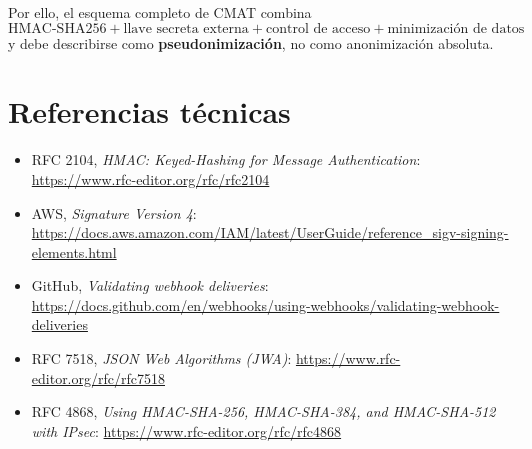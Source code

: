 \documentclass[11pt,a4paper]{article}
\begin{document}
Por ello, el esquema completo de CMAT combina
\[
\boxed{
\text{HMAC-SHA256}
+
\text{llave secreta externa}
+
\text{control de acceso}
+
\text{minimización de datos}
}
\]
y debe describirse como \textbf{pseudonimización}, no como anonimización absoluta.

\section{Referencias técnicas}

\begin{itemize}[leftmargin=*]
    \item RFC 2104, \emph{HMAC: Keyed-Hashing for Message Authentication}: \url{https://www.rfc-editor.org/rfc/rfc2104}
    \item AWS, \emph{Signature Version 4}: \url{https://docs.aws.amazon.com/IAM/latest/UserGuide/reference_sigv-signing-elements.html}
    \item GitHub, \emph{Validating webhook deliveries}: \url{https://docs.github.com/en/webhooks/using-webhooks/validating-webhook-deliveries}
    \item RFC 7518, \emph{JSON Web Algorithms (JWA)}: \url{https://www.rfc-editor.org/rfc/rfc7518}
    \item RFC 4868, \emph{Using HMAC-SHA-256, HMAC-SHA-384, and HMAC-SHA-512 with IPsec}: \url{https://www.rfc-editor.org/rfc/rfc4868}
\end{itemize}
\end{document}
